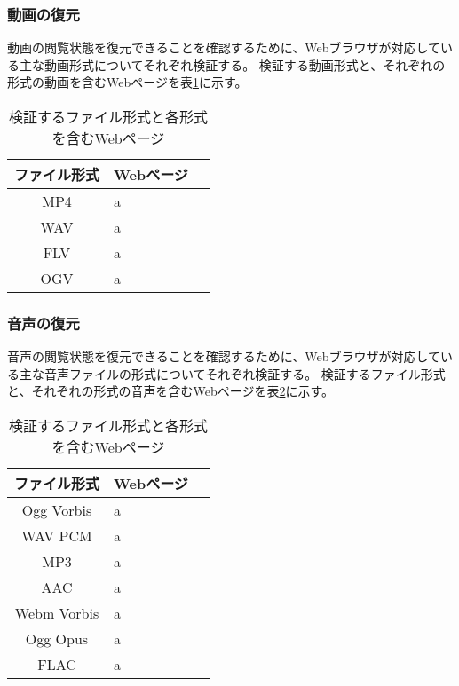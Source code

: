 \subsubsection{動画の復元}
動画の閲覧状態を復元できることを確認するために、Webブラウザが対応している主な動画形式についてそれぞれ検証する。
検証する動画形式と、それぞれの形式の動画を含むWebページを表\ref{tb:evl-video-check-list}に示す。

\begin{table}[htbp]
  \begin{center}
    \caption{検証するファイル形式と各形式を含むWebページ}
    \label{tb:evl-video-check-list}
    \begin{tabular}{|c|l|l|}
      \hline
      ファイル形式 & Webページ \\\hline\hline
      MP4 & a \\\hline
      WAV & a \\\hline
      FLV & a \\\hline
      OGV & a \\\hline
    \end{tabular}
  \end{center}
\end{table}

\subsubsection{音声の復元}
音声の閲覧状態を復元できることを確認するために、Webブラウザが対応している主な音声ファイルの形式についてそれぞれ検証する。
検証するファイル形式と、それぞれの形式の音声を含むWebページを表\ref{tb:evl-audio-check-list}に示す。

\begin{table}[htbp]
  \begin{center}
    \caption{検証するファイル形式と各形式を含むWebページ}
    \label{tb:evl-audio-check-list}
    \begin{tabular}{|c|l|l|}
      \hline
      ファイル形式 & Webページ \\\hline\hline
      Ogg Vorbis & a \\\hline
      WAV PCM & a \\\hline
      MP3 & a \\\hline
      AAC & a \\\hline
      Webm Vorbis & a \\\hline
      Ogg Opus & a \\\hline
      FLAC & a \\\hline
    \end{tabular}
  \end{center}
\end{table}

